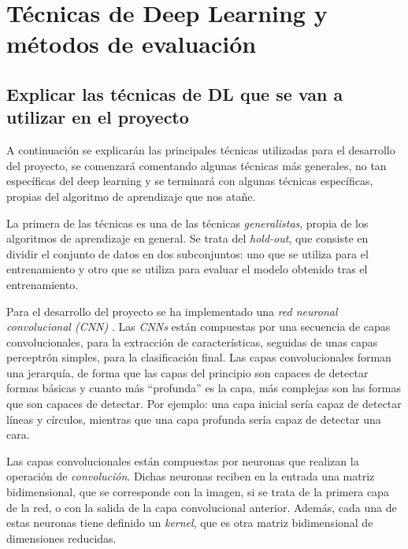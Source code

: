 \section{Técnicas de Deep Learning y métodos de evaluación}
\label{sec:tecnicas_de_deep_learning_y_metodos_de_evaluacion}

\subsection{Explicar las técnicas de DL que se van a utilizar en el proyecto}

A continuación se explicarán las principales técnicas utilizadas para el desarrollo del proyecto, se comenzará comentando algunas técnicas más generales, no tan específicas del deep learning y se terminará con algunas técnicas específicas, propias del algoritmo de aprendizaje que nos atañe.

La primera de las técnicas es una de las técnicas \textit{generalistas}, propia de los algoritmos de aprendizaje en general. Se trata del \textit{hold-out}, que consiste en dividir el conjunto de datos en dos subconjuntos: uno que se utiliza para el entrenamiento y otro que se utiliza para evaluar el modelo obtenido tras el entrenamiento.

Para el desarrollo del proyecto se ha implementado una \textit{red neuronal convolucional (CNN)} \cite{s5_cnn1} \cite{s5_cnn2} \cite{s5_cnn3}. Las \textit{CNNs} están compuestas por una secuencia de capas convolucionales, para la extracción de características, seguidas de unas capas perceptrón simples, para la clasificación final. Las capas convolucionales forman una jerarquía, de forma que las capas del principio son capaces de detectar formas básicas y cuanto más ``profunda'' es la capa, más complejas son las formas que son capaces de detectar. Por ejemplo: una capa inicial sería capaz de detectar líneas y círculos, mientras que una capa profunda sería capaz de detectar una cara.

Las capas convolucionales están compuestas por neuronas que realizan la operación de \textit{convolución}. Dichas neuronas reciben en la entrada una matriz bidimensional, que se corresponde con la imagen, si se trata de la primera capa de la red, o con la salida de la capa convolucional anterior. Además, cada una de estas neuronas tiene definido un \textit{kernel}, que es otra matriz bidimensional de dimensiones reducidas.

